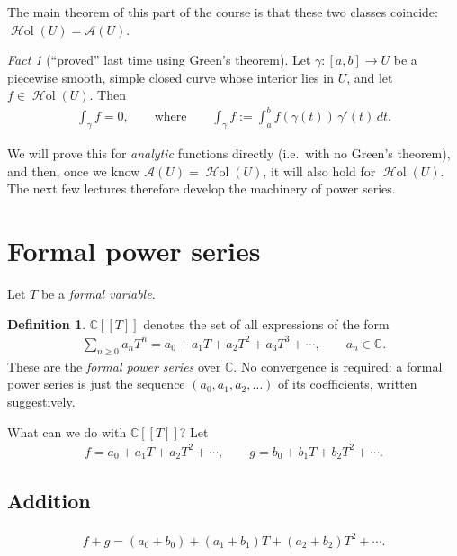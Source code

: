 \documentclass[11pt]{article}
\theoremstyle{plain}
\theoremstyle{definition}
\newtheorem{definition}[theorem]{Definition}
\theoremstyle{remark}
\newtheorem*{fact}{Fact}
\numberwithin{equation}{section}
\newcommand{\be}{\begin{eqnarray}}
\newcommand{\ee}{\end{eqnarray}}
\newcommand{\C}{\mathbb{C}}
\DeclareMathOperator{\Hol}{\mathcal{H}\mathrm{ol}}
\newcommand{\A}{\mathcal{A}}
\newcommand{\CT}{\C[[T]]}
\begin{document}
The main theorem of this part of the course is that these two classes
coincide: $\Hol(U)=\A(U)$.

\begin{fact}[``proved'' last time using Green's theorem]
Let $\gamma\colon[a,b]\to U$ be a piecewise smooth, simple closed curve whose
interior lies in $U$, and let $f\in\Hol(U)$. Then
\be
 \int_\gamma f=0,
 \qquad\text{where}\qquad
 \int_\gamma f:=\int_a^b f(\gamma(t))\,\gamma'(t)\,dt.
\ee
\end{fact}

\begin{center}
\end{center}

We will prove this for \emph{analytic} functions directly (i.e.\ with no
Green's theorem), and then, once we know $\A(U)=\Hol(U)$, it will also hold
for $\Hol(U)$. The next few lectures therefore develop the machinery of
power series.

\section{Formal power series}
Let $T$ be a \emph{formal variable}.

\begin{definition}
$\CT$ denotes the set of all expressions of the form
\be
 \sum_{n\ge0}a_nT^n=a_0+a_1T+a_2T^2+a_3T^3+\cdots,
 \qquad a_n\in\C.
\ee
These are the \emph{formal power series} over $\C$. No convergence is
required: a formal power series is just the sequence $(a_0,a_1,a_2,\dots)$
of its coefficients, written suggestively.
\end{definition}

What can we do with $\CT$? Let
\be
 f=a_0+a_1T+a_2T^2+\cdots,
 \qquad
 g=b_0+b_1T+b_2T^2+\cdots.
\ee

\subsection*{Addition}
\be
 f+g=(a_0+b_0)+(a_1+b_1)T+(a_2+b_2)T^2+\cdots.
\ee
\end{document}
